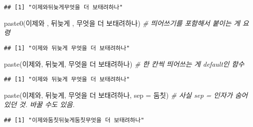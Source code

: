 \documentclass[
  12,
]{article}
\newenvironment{Shaded}{\begin{snugshade}}{\end{snugshade}}
\newcommand{\AttributeTok}[1]{\textcolor[rgb]{0.77,0.63,0.00}{#1}}
\newcommand{\CommentTok}[1]{\textcolor[rgb]{0.56,0.35,0.01}{\textit{#1}}}
\newcommand{\FunctionTok}[1]{\textcolor[rgb]{0.00,0.00,0.00}{#1}}
\newcommand{\NormalTok}[1]{#1}
\newcommand{\StringTok}[1]{\textcolor[rgb]{0.31,0.60,0.02}{#1}}
\begin{document}
\begin{verbatim}
## [1] "이제와뒤늦게무엇을 더 보태려하나"
\end{verbatim}

\begin{Shaded}
\begin{Highlighting}[]
\FunctionTok{paste0}\NormalTok{(}\StringTok{\textquotesingle{}이제와 \textquotesingle{}}\NormalTok{, }\StringTok{\textquotesingle{}뒤늦게 \textquotesingle{}}\NormalTok{, }\StringTok{\textquotesingle{}무엇을 더 보태려하나\textquotesingle{}}\NormalTok{) }\CommentTok{\# 띄어쓰기를 포함해서 붙이는 게 요령}
\end{Highlighting}
\end{Shaded}

\begin{verbatim}
## [1] "이제와 뒤늦게 무엇을 더 보태려하나"
\end{verbatim}

\begin{Shaded}
\begin{Highlighting}[]
\FunctionTok{paste}\NormalTok{(}\StringTok{\textquotesingle{}이제와\textquotesingle{}}\NormalTok{, }\StringTok{\textquotesingle{}뒤늦게\textquotesingle{}}\NormalTok{, }\StringTok{\textquotesingle{}무엇을 더 보태려하나\textquotesingle{}}\NormalTok{) }\CommentTok{\# 한 칸씩 띄어쓰는 게 default인 함수}
\end{Highlighting}
\end{Shaded}

\begin{verbatim}
## [1] "이제와 뒤늦게 무엇을 더 보태려하나"
\end{verbatim}

\begin{Shaded}
\begin{Highlighting}[]
\FunctionTok{paste}\NormalTok{(}\StringTok{\textquotesingle{}이제와\textquotesingle{}}\NormalTok{, }\StringTok{\textquotesingle{}뒤늦게\textquotesingle{}}\NormalTok{, }\StringTok{\textquotesingle{}무엇을 더 보태려하나\textquotesingle{}}\NormalTok{, }\AttributeTok{sep =} \StringTok{\textquotesingle{}둠칫\textquotesingle{}}\NormalTok{) }\CommentTok{\# 사실 sep = \textquotesingle{} \textquotesingle{} 인자가 숨어있던 것. 바꿀 수도 있음.}
\end{Highlighting}
\end{Shaded}

\begin{verbatim}
## [1] "이제와둠칫뒤늦게둠칫무엇을 더 보태려하나"
\end{verbatim}
\end{document}
